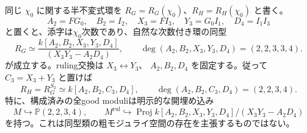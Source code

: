 \begin{theorem}[全半不変式環の明示表示]
\label{thm:qa-global-h2-full-semiinvariant-ring}
同じ $\chi_0$ に関する半不変式環を
$R_G=R_G(\chi_0)$、$R_H=R_H(\chi_0)$ と書く。
\[
 A_2=FG_0,\quad B_2=I_2,\quad
 X_3=FI_3,\quad Y_3=G_0I_1,\quad D_4=I_1I_3
\]
と置くと、添字は$\chi_0$次数であり、自然な次数付き環の同型
\[
 \boxed{\quad
 R_G\simeq
 \frac{k[A_2,B_2,X_3,Y_3,D_4]}
 {(X_3Y_3-A_2D_4)},\qquad
 \deg(A_2,B_2,X_3,Y_3,D_4)=(2,2,3,3,4).
 \quad}
 \tag{RG}\label{eq:qa-global-h2-ordered-semiinvariant-ring}
\]
が成立する。ruling交換は $X_3\leftrightarrow Y_3$、
$A_2,B_2,D_4$ を固定する。従って
$C_3=X_3+Y_3$ と置けば
\[
 \boxed{\quad
 R_H=R_G^{S_2}\simeq k[A_2,B_2,C_3,D_4],
 \qquad \deg(A_2,B_2,C_3,D_4)=(2,2,3,4).
 \quad}
 \tag{RH}\label{eq:qa-global-h2-unordered-semiinvariant-ring}
\]
特に、構成済みの全good moduliは明示的な開埋め込み
\[
 M\hookrightarrow\mathbb P(2,2,3,4),\qquad
 M^{\mathrm{rul}}\hookrightarrow
 \operatorname{Proj}k[A_2,B_2,X_3,Y_3,D_4]/(X_3Y_3-A_2D_4)
 \tag{WP}\label{eq:qa-global-h2-weighted-projective-hull}
\]
を持つ。これは同型類の粗モジュライ空間の存在を主張するものではない。
\end{theorem}
